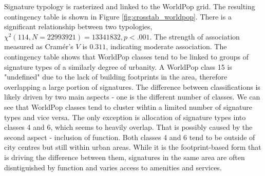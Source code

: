 \documentclass[fleqn,10pt]{wlscirep}
\begin{document}
Signature typology is rasterized and linked to the WorldPop grid. The resulting
contingency table is shown in Figure \ref{fig:crosstab_worldpop}. There is a significant relationship between
two typologies, $\chi^{2} (114, N = 22993921) = 13341832, p < .001$. The strength of
association measured as Cram\'{e}r's $V$ is $0.311$, indicating moderate association.
The contingency table shows that WorldPop classes tend to be linked to groups of
signature types of a similarly degree of urbanity. A WorldPop class 15 is "undefined" due
to the lack of building footprints in the area, therefore overlapping a large portion of
signatures.
The difference between classifications is likely driven by two main aspects - one is the different
number of classes. We can see that WorldPop classes tend to cluster wihtin a limited number of
signature types and vice versa. The only exception is allocation of signature types into classes 4 and 6,
which seems to heavily overlap. That is possibly caused by the second aspect - inclusion of function. Both
classes 4 and 6 tend to be outside of city centres but still within urban areas. While it is
the footprint-based form that is driving the difference between them, signatures in the same
area are often disntiguished by function and varies access to amenities and services.
\end{document}
